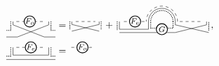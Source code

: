 \documentclass[aps,pra,groupedaddress,twocolumn,notitlepage,superscriptaddress,10pt]{revtex4-1}
\begin{document}
\begin{align}
\tikz[scale=.8,baseline=-1.5ex]{
    \draw[dashed] (-0.15,0) -- (1.15,0);
    \draw[thick,fill=white] (0.45,0) circle (0.25) node[anchor=center] {\footnotesize$F_o$};
    \draw (-0.3,0.0)-- (-0.3,-0.15);
    \draw (-0.3,-0.15)-- (1.1,-0.7);
    \draw (1.3,-0.15)-- (1.3,0.0);
    \draw (1.3,-0.15)-- (-0.1,-0.7);
    \draw (-0.6,-0.7)-- (-0.1,-0.7);
    \draw (1.1,-0.7)-- (1.6,-0.7);    \draw[densely dotted,thick]   (-0.4,0.0)-- (-0.4,-0.4)--  (-0.6,-0.4);
    \draw[densely dotted,thick] (1.4,0.0) -- (1.4,-0.4) -- (1.6,-0.4) ;
    }
=& \ 
\tikz[scale=0.7,baseline=-1.5ex]{
    \draw[dashed] (0,0) -- (1,0);
    \draw (-0.2,0.0)-- (-0.2,-0.15);
    \draw (-0.2,-0.15)-- (1.2,-0.5);
    \draw (1.2,-0.15)-- (1.2,0.0);
    \draw (1.2,-0.15)-- (-0.2,-0.5);
    \draw[densely dotted,thick] (-0.3,0.0)-- (-0.3,-0.4);
    \draw[densely dotted,thick] (1.3,-0.4)-- (1.3,0.0);
    }
  \,
+
 \,
\tikz[scale=0.8,baseline=-1.5ex]{
    \draw[dashed] (0,0) -- (1,0);
    \draw[thick,fill=white] (0.5,0) circle (0.25) node[anchor=center] {\footnotesize$F_e$};
    \draw (-0.2,0.)-- (-0.2,-0.35);
    \draw (1.1,0.)-- (1.1,-0.35);
    \draw[densely dotted,thick] (-0.3,0.)-- (-0.3,-0.4);
    \draw[densely dotted,thick] (1.2,-0.3)-- (1.2,0.);
    \draw[dashed] (2.5,0) -- (3.5,0);
    \draw (2.3,0.)-- (2.3,-0.15);
    \draw (2.3,-0.15)-- (3.8,-0.5);
    \draw (3.7,-0.15)-- (3.7,0.);
    \draw (3.7,-0.15)-- (2.3,-0.5);
    \draw[densely dotted,thick] (2.2,0.)-- (2.2,-0.3);
    \draw[densely dotted,thick] (3.8,-0.4)-- (3.8,0.);
    \draw[densely dotted,thick] (1.2,-0.3)--(2.2,-0.3);
    \draw (-0.2,-0.35)-- (1.1,-0.35);
    \draw (-0.2,-0.5)-- (2.3,-0.5);
    \draw[thick,fill=white] (1.7,-0.35) circle (0.25) node[anchor=center] {\footnotesize$G$};
    \draw[densely dotted,thick] (2.2,0) arc (0:180:0.5);
    \draw[dashed] (2.4,0) arc (0:180:0.7);
    \draw (2.3,0) arc (0:180:0.6);
 }\, , \\
\tikz[scale=.8,baseline=-1.5ex]{
    \draw[dashed] (-0.15,0) -- (1.15,0);
    \draw[thick,fill=white] (0.5,0) circle (0.25) node[anchor=center] {\footnotesize$F_e$};
    \draw (-0.3,0.0)-- (-0.3,-0.35)-- (1.3,-0.35) -- (1.3,0);
    \draw (-0.6,-0.55)-- (1.6,-0.55);
    \draw[densely dotted,thick]   (-0.4,0.0)-- (-0.4,-0.4)--  (-0.6,-0.4);
    \draw[densely dotted,thick] (1.4,0.0) -- (1.4,-0.4) -- (1.6,-0.4) ;
    }
=& 
\ \,
\tikz[scale=0.8,baseline=-1.5ex]{
    \draw[dashed] (0,0) -- (1,0);
    \draw[thick,fill=white] (0.5,0) circle (0.25) node[anchor=center] {\footnotesize$F_o$};
}
\end{align}
\end{document}
